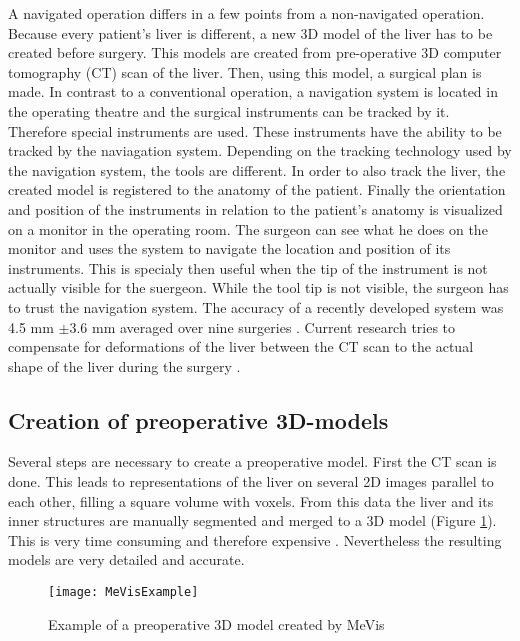 A navigated operation differs in a few points from a non-navigated operation.
Because every patient's liver is different, a new 3D model of the liver has to
be created before surgery. This models are created from pre-operative 3D
computer tomography (CT) scan of the liver. Then, using this model, a surgical plan is made.
In contrast to a conventional operation, a navigation system is located in the
operating theatre and the surgical instruments can be tracked by it. Therefore special instruments are used. These
instruments have the ability to be tracked by the naviagation system. Depending
on the tracking technology used by the navigation system, the tools are different.
In order to also track the liver, the created model is registered to the anatomy
of the patient. Finally the orientation and position
of the instruments in relation to the patient's anatomy is visualized on a
monitor in the operating room. The surgeon can see what he does on the
monitor and uses the system to navigate the location and position of its
instruments. This is specialy then useful when the tip of the instrument is not
actually visible for the suergeon. While the tool tip is not visible, the
surgeon has to trust the navigation system. The accuracy of a recently developed system 
was 4.5 mm $\pm$3.6 mm averaged over nine surgeries \cite{peterhans2011navigation}.
Current research tries to compensate for deformations of the liver between the CT
scan to the actual shape of the liver during the surgery \cite{clements2017deformation}
\cite{clements2015validation}. 
\subsection{Creation of preoperative 3D-models}
Several steps are necessary to create a preoperative model. First the 
CT scan is done. This leads to representations of the liver on several 2D images parallel
to each other, filling a square volume with voxels. From this data the liver and
its inner structures are manually segmented and merged to a 3D model (Figure \ref{fig:MeVisExample}). This is very
time consuming and therefore expensive \cite{numminen2005preoperative}.
Nevertheless the resulting models are very detailed and accurate.
\begin{figure}[H]
  \centering
 \texttt{[image: MeVisExample]}
 \caption{Example of a preoperative 3D model created by MeVis}%
  \label{fig:MeVisExample}
\end{figure}

